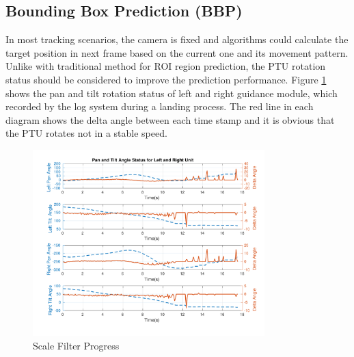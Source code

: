 \documentclass[journal,article,submit,moreauthors,pdftex,10pt,a4paper]{mdpi}
\begin{document}

\subsection{Bounding Box Prediction (BBP)}
In most tracking scenarios, the camera is fixed and algorithms could calculate the target position in next frame based on the current one and its movement pattern. Unlike with traditional method for ROI region prediction, the PTU rotation status should be considered to improve the prediction performance. Figure \ref{fig:chp04_02_pan_tilt_status} shows the pan and tilt rotation status of left and right guidance module, which recorded by the log system during a landing process. The red line in each diagram shows the delta angle between each time stamp and it is obvious that the PTU rotates not in a stable speed.
\begin{figure}[!t]
	\centering
	\includegraphics[width=0.8\textwidth]{Figs/chp04_02_pan_tilt_status.pdf}	
	\caption{Scale Filter Progress}
	\label{fig:chp04_02_pan_tilt_status}
\end{figure}
\end{document}
